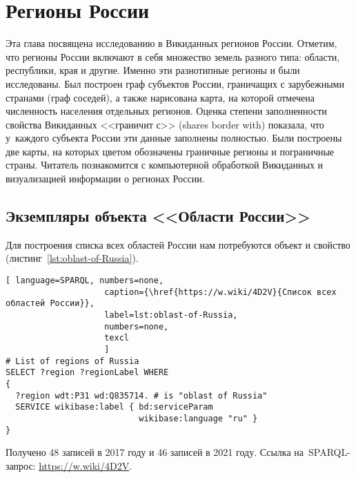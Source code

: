 ﻿\chapter{Регионы России}
\label{ch:oblast-of-Russia}
%
\label{question:q_subjects_of_Russia_3}


Эта глава посвящена исследованию в Викиданных регионов России. 
Отметим, что регионы России включают в себя множество земель разного 
типа: области, республики, края и другие. Именно эти разнотипные регионы 
и были исследованы. 
Был построен граф субъектов России, граничащих с зарубежными странами (граф соседей), 
а также нарисована карта, 
на которой отмечена численность населения отдельных регионов. 
Оценка степени заполненности свойства Викиданных <<граничит с>> (shares border with) 
показала, что у~каждого субъекта России эти данные заполнены полностью. 
Были построены две карты, на которых цветом обозначены граничные регионы и пограничные страны.
Читатель познакомится с компьютерной обработкой Викиданных и визуализацией 
информации о регионах России.


\section{Экземпляры объекта <<Области России>>}

Для построения списка всех областей России нам потребуются объект 
 и свойство  
(листинг~\ref{lst:oblast-of-Russia}).


\begin{marginfigure}[-5\baselineskip]
\begin{lstlisting}[ language=SPARQL, numbers=none,
                    caption={\href{https://w.wiki/4D2V}{Список всех областей России}},
                    label=lst:oblast-of-Russia,
                    numbers=none,
                    texcl 
                    ]
# List of regions of Russia
SELECT ?region ?regionLabel WHERE
{
  ?region wdt:P31 wd:Q835714. # is "oblast of Russia"
  SERVICE wikibase:label { bd:serviceParam 
                           wikibase:language "ru" }
}
\end{lstlisting}%
Получено 48 записей в 2017 году и 46 записей в 2021 году. Ссылка на~SPARQL-запрос: \href{https://w.wiki/4D2V}{https://w.wiki/4D2V}.\\
\end{marginfigure}


